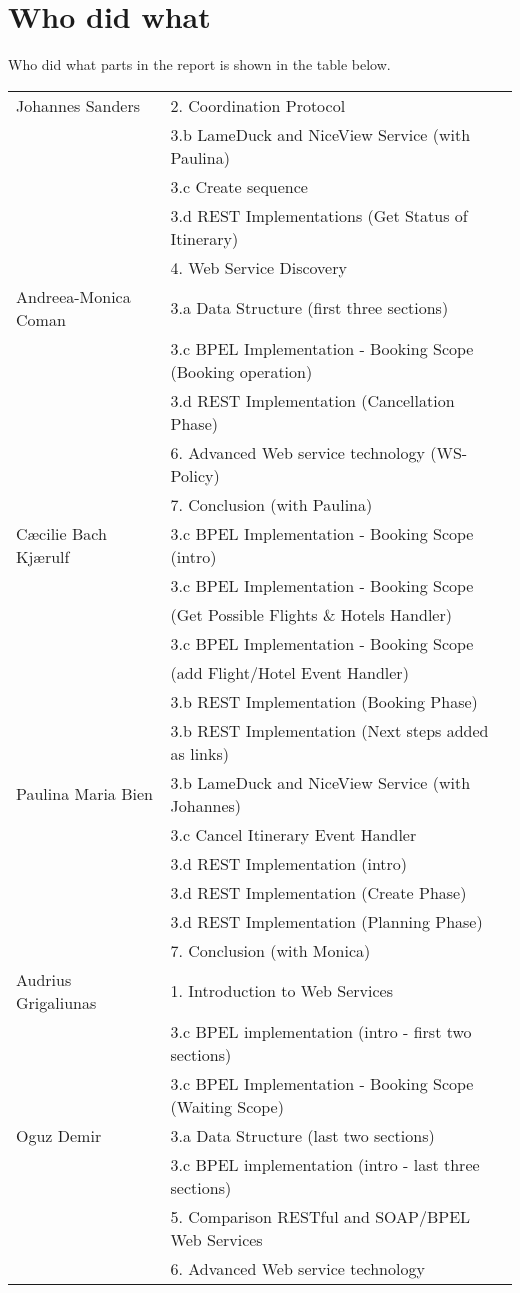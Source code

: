 \section{Who did what}
Who did what parts in the report is shown in the table below.
\begin{table} [H]
\begin{tabular}{|l|l|}  \hline
Johannes Sanders & 2. Coordination Protocol\\
 & 3.b LameDuck and NiceView Service (with Paulina)\\
 & 3.c Create sequence\\
 & 3.d REST Implementations (Get Status of Itinerary)\\
 & 4. Web Service Discovery \\ \hline
Andreea-Monica Coman & 3.a Data Structure (first three sections) \\
 & 3.c BPEL Implementation - Booking Scope (Booking operation) \\
 & 3.d REST Implementation (Cancellation Phase) \\
 & 6. Advanced Web service technology (WS-Policy) \\
 & 7. Conclusion (with Paulina) \\ \hline
Cæcilie Bach Kjærulf & 3.c BPEL Implementation - Booking Scope (intro) \\
 & 3.c BPEL Implementation - Booking Scope \\
 & \hspace*{1cm}(Get Possible Flights \& Hotels Handler) \\
 & 3.c BPEL Implementation - Booking Scope \\
 & \hspace*{1cm}(add Flight/Hotel Event Handler) \\
 & 3.b REST Implementation (Booking Phase) \\
 & 3.b REST Implementation (Next steps added as links) \\ \hline
Paulina Maria Bien & 3.b LameDuck and NiceView Service (with Johannes) \\
 & 3.c Cancel Itinerary Event Handler \\
 & 3.d REST Implementation (intro) \\
 & 3.d REST Implementation (Create Phase) \\
 & 3.d REST Implementation (Planning Phase) \\
 & 7. Conclusion (with Monica) \\ \hline
Audrius Grigaliunas & 1. Introduction to Web Services \\
 & 3.c BPEL implementation (intro - first two sections)  \\
 & 3.c BPEL Implementation - Booking Scope (Waiting Scope) \\ \hline
Oguz Demir & 3.a Data Structure (last two sections) \\
 & 3.c BPEL implementation (intro - last three sections) \\
 & 5. Comparison RESTful and SOAP/BPEL Web Services  \\
 & 6. Advanced Web service technology \\ \hline
\end{tabular}
\end{table}